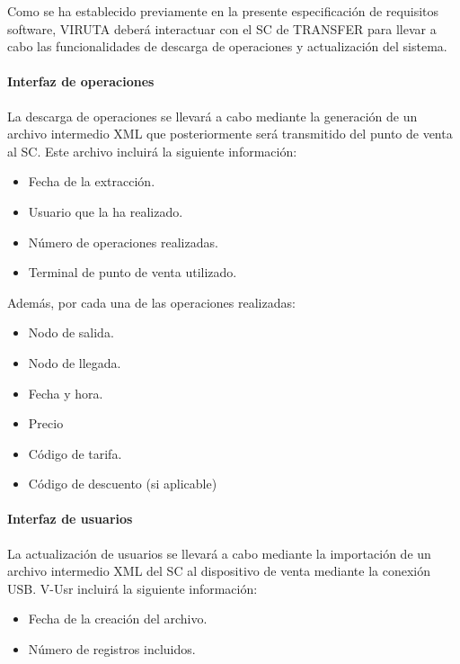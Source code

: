Como se ha establecido previamente en la presente especificación de requisitos software, VIRUTA deberá interactuar con el SC de TRANSFER para llevar a cabo las funcionalidades de descarga de operaciones y actualización del sistema.

\paragraph{Interfaz de operaciones}

La descarga de operaciones se llevará a cabo mediante la generación de un archivo intermedio XML que posteriormente será transmitido del punto de venta al SC. Este archivo incluirá la siguiente información:

\begin{itemize}
\item Fecha de la extracción.
\item Usuario que la ha realizado.
\item Número de operaciones realizadas.
\item Terminal de punto de venta utilizado.
\end{itemize}

Además, por cada una de las operaciones realizadas:

\begin{itemize}
\item Nodo de salida.
\item Nodo de llegada.
\item Fecha y hora.
\item Precio
\item Código de tarifa.
\item Código de descuento (si aplicable)
\end{itemize}

\paragraph{Interfaz de usuarios}

La actualización de usuarios se llevará a cabo mediante la importación de un archivo intermedio XML del SC al dispositivo de venta mediante la conexión USB. V-Usr incluirá la siguiente información:

\begin{itemize}
\item Fecha de la creación del archivo.
\item Número de registros incluidos.
\end{itemize}

